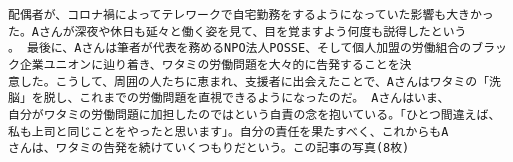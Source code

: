 \documentclass[11pt]{article}
\begin{document}
\begin{Verbatim}[commandchars=\\\{\}]
配偶者が、コロナ禍によってテレワークで自宅勤務をするようになっていた影響も大きかった。Aさんが深夜や休日も延々と働く姿を見て、目を覚ますよう何度も説得したという
。 最後に、Aさんは筆者が代表を務めるNPO法人POSSE、そして個人加盟の労働組合のブラック企業ユニオンに辿り着き、ワタミの労働問題を大々的に告発することを決
意した。こうして、周囲の人たちに恵まれ、支援者に出会えたことで、Aさんはワタミの「洗脳」を脱し、これまでの労働問題を直視できるようになったのだ。 Aさんはいま、
自分がワタミの労働問題に加担したのではという自責の念を抱いている。「ひとつ間違えば、私も上司と同じことをやったと思います」。自分の責任を果たすべく、これからもA
さんは、ワタミの告発を続けていくつもりだという。この記事の写真(8枚)
    \end{Verbatim}


    
    
    
\end{document}
